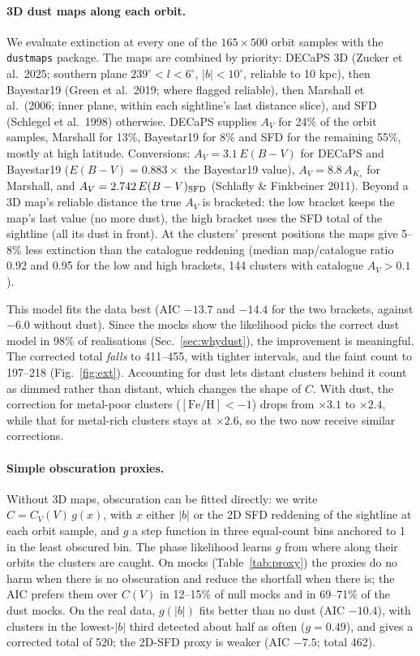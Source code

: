 \documentclass[11pt,a4paper]{article}
\newcommand{\feh}{[\mathrm{Fe/H}]}
\begin{document}
\paragraph{3D dust maps along each orbit.} We evaluate extinction at every one of the
$165\times500$ orbit samples with the \texttt{dustmaps} package. The maps are combined by priority:
DECaPS 3D (Zucker et al.\ 2025; southern plane $239^\circ<l<6^\circ$, $|b|<10^\circ$, reliable to
10 kpc), then Bayestar19 (Green et al.\ 2019; where flagged reliable), then Marshall et al.\ (2006;
inner plane, within each sightline's last distance slice), and SFD (Schlegel et al.\ 1998) otherwise. DECaPS supplies
$A_V$ for 24\% of the orbit samples, Marshall for 13\%, Bayestar19 for 8\% and SFD for the remaining
55\%, mostly at high latitude. Conversions: $A_V = 3.1\,E(B-V)$ for DECaPS and Bayestar19
($E(B-V) = 0.883\times$ the Bayestar19 value), $A_V = 8.8\,A_{K_s}$ for Marshall, and
$A_V = 2.742\,E(B-V)_{\rm SFD}$ (Schlafly \& Finkbeiner 2011). Beyond a 3D map's reliable distance
the true $A_V$ is bracketed: the low bracket keeps the map's last value (no more dust), the high
bracket uses the SFD total of the sightline (all its dust in front). At the clusters' present
positions the maps give 5--8\% less extinction than the catalogue reddening (median map/catalogue ratio 0.92 and 0.95 for the low and high brackets, 144 clusters with catalogue $A_V>0.1$).

This model fits the data best (AIC $-13.7$ and $-14.4$ for the two brackets, against $-6.0$
without dust). Since the mocks show the likelihood picks the correct dust model in 98\% of
realisations (Sec.~\ref{sec:whydust}), the improvement is meaningful. The corrected total
\emph{falls} to 411--455, with tighter intervals, and the faint count to 197--218
(Fig.~\ref{fig:ext}). Accounting for dust lets distant clusters behind it count as dimmed rather
than distant, which changes the shape of $C$. With dust, the correction for metal-poor clusters
($\feh<-1$) drops from $\times3.1$ to $\times2.4$, while that for metal-rich clusters stays at
$\times2.6$, so the two now receive similar corrections.

\paragraph{Simple obscuration proxies.} Without 3D maps, obscuration can be fitted directly: we write
$C = C_V(V)\,g(x)$, with $x$ either $|b|$ or the 2D SFD reddening of the sightline at each orbit
sample, and $g$ a step function in three equal-count bins anchored to 1 in the least obscured bin.
The phase likelihood learns $g$ from where along their orbits the clusters are caught. On mocks
(Table~\ref{tab:proxy}) the proxies do no harm when there is no obscuration and reduce the
shortfall when there is; the AIC prefers them over $C(V)$ in 12--15\% of null mocks and in 69--71\%
of the dust mocks. On the real data, $g(|b|)$ fits better than no dust (AIC $-10.4$), with clusters
in the lowest-$|b|$ third detected about half as often ($g = 0.49$), and gives a corrected total of
520; the 2D-SFD proxy is weaker (AIC $-7.5$; total 462).
\end{document}
